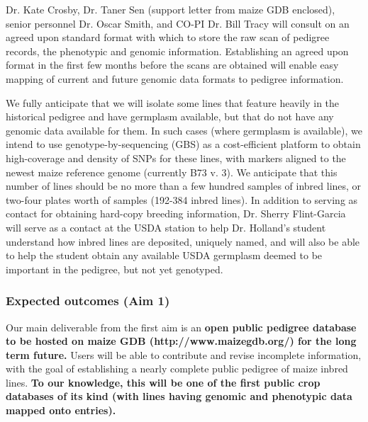 \documentclass[12pt]{article}
\begin{document}
Dr. Kate Crosby, Dr. Taner Sen (support letter from maize GDB enclosed), senior personnel Dr. Oscar Smith, and CO-PI Dr. Bill Tracy will consult on an agreed upon standard format with which to store the raw scan of pedigree records, the phenotypic and genomic information. 
Establishing an agreed upon format in the first few months before the scans are obtained will enable easy mapping of current and future genomic data formats to pedigree information.

We fully anticipate that we will isolate some lines that feature heavily in the historical pedigree and have germplasm available, but that do not have any genomic data available for them. 
In such cases (where germplasm is available), we intend to use genotype-by-sequencing (GBS) \citep{Elshire:2011ha} as a cost-efficient platform \citep{Glaubitz:2014eu} to obtain high-coverage and density of SNPs  for these lines, with markers aligned to the newest maize reference genome (currently B73 v. 3). We anticipate that this number of lines should be no more than a few hundred samples of inbred lines, or two-four plates worth of samples (192-384 inbred lines).
In addition to serving as contact for obtaining hard-copy breeding information, Dr. Sherry Flint-Garcia will serve as a contact at the USDA station to help Dr. Holland's student understand how inbred lines are deposited, uniquely named, and will also be able to help the student obtain any available USDA germplasm deemed to be important in the pedigree, but not yet genotyped.

\subsubsection*{Expected outcomes (Aim 1)}
Our main deliverable from the first aim is an \textbf{open public pedigree database to be hosted on maize GDB (http://www.maizegdb.org/) for the long term future.} Users will be able to contribute and revise incomplete information, with the goal of establishing a nearly complete public pedigree of maize inbred lines. \textbf{To our knowledge, this will be one of the first public crop databases of its kind (with lines having genomic and phenotypic data mapped onto entries).}  
\end{document}
